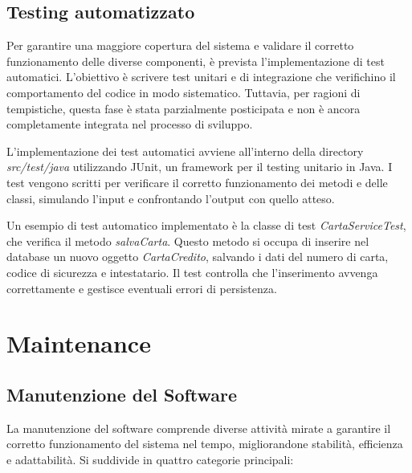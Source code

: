 \documentclass[a4paper,12pt]{article}
\begin{document}
\subsection{Testing automatizzato}
Per garantire una maggiore copertura del sistema e validare il corretto funzionamento delle diverse componenti, è prevista l'implementazione di test automatici. L'obiettivo è scrivere test unitari e di integrazione che verifichino il comportamento del codice in modo sistematico. Tuttavia, per ragioni di tempistiche, questa fase è stata parzialmente posticipata e non è ancora completamente integrata nel processo di sviluppo.

L'implementazione dei test automatici avviene all'interno della directory \textit{src/test/java} utilizzando JUnit, un framework per il testing unitario in Java. I test vengono scritti per verificare il corretto funzionamento dei metodi e delle classi, simulando l'input e confrontando l'output con quello atteso.

Un esempio di test automatico implementato è la classe di test \textit{CartaServiceTest}, che verifica il metodo \textit{salvaCarta}. Questo metodo si occupa di inserire nel database un nuovo oggetto \textit{CartaCredito}, salvando i dati del numero di carta, codice di sicurezza e intestatario. Il test controlla che l'inserimento avvenga correttamente e gestisce eventuali errori di persistenza.

\newpage
\section{Maintenance}
\subsection{Manutenzione del Software}

La manutenzione del software comprende diverse attività mirate a garantire il corretto funzionamento del sistema nel tempo, migliorandone stabilità, efficienza e adattabilità. Si suddivide in quattro categorie principali:
\end{document}
